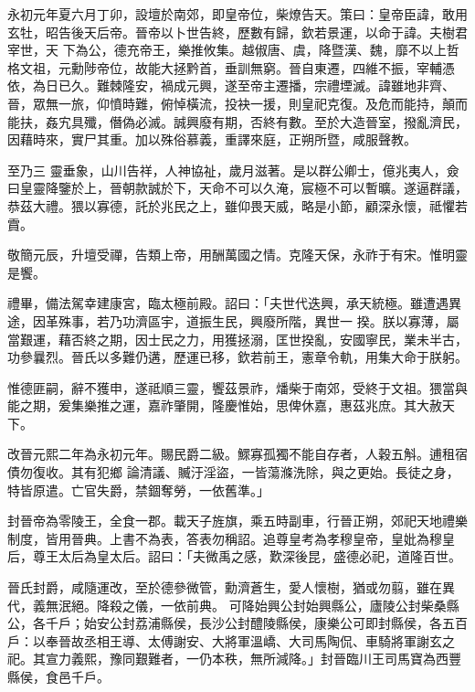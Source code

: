 
\begin{pinyinscope}

 永初元年夏六月丁卯，設壇於南郊，即皇帝位，柴燎告天。策曰：皇帝臣諱，敢用玄牡，昭告後天后帝。晉帝以卜世告終，歷數有歸，欽若景運，以命于諱。夫樹君宰世，天
 下為公，德充帝王，樂推攸集。越俶唐、虞，降暨漢、魏，靡不以上哲格文祖，元勳陟帝位，故能大拯黔首，垂訓無窮。晉自東遷，四維不振，宰輔憑依，為日已久。難棘隆安，禍成元興，遂至帝主遷播，宗禮堙滅。諱雖地非齊、晉，眾無一旅，仰憤時難，俯悼橫流，投袂一援，則皇祀克復。及危而能持，顛而能扶，姦宄具殲，僭偽必滅。誠興廢有期，否終有數。至於大造晉室，撥亂濟民，因藉時來，實尸其重。加以殊俗慕義，重譯來庭，正朔所暨，咸服聲教。



 至乃三
 靈垂象，山川告祥，人神協祉，歲月滋著。是以群公卿士，億兆夷人，僉曰皇靈降鑒於上，晉朝款誠於下，天命不可以久淹，宸極不可以暫曠。遂逼群議，恭茲大禮。猥以寡德，託於兆民之上，雖仰畏天威，略是小節，顧深永懷，祗懼若霣。



 敬簡元辰，升壇受禪，告類上帝，用酬萬國之情。克隆天保，永祚于有宋。惟明靈是饗。



 禮畢，備法駕幸建康宮，臨太極前殿。詔曰：「夫世代迭興，承天統極。雖遭遇異途，因革殊事，若乃功濟區宇，道振生民，興廢所階，異世一
 揆。朕以寡薄，屬當艱運，藉否終之期，因士民之力，用獲拯溺，匡世揆亂，安國寧民，業未半古，功參曩烈。晉氏以多難仍遘，歷運已移，欽若前王，憲章令軌，用集大命于朕躬。



 惟德匪嗣，辭不獲申，遂祗順三靈，饗茲景祚，燔柴于南郊，受終于文祖。猥當與能之期，爰集樂推之運，嘉祚肇開，隆慶惟始，思俾休嘉，惠茲兆庶。其大赦天下。



 改晉元熙二年為永初元年。賜民爵二級。鰥寡孤獨不能自存者，人穀五斛。逋租宿債勿復收。其有犯鄉
 論清議、贓汙淫盜，一皆蕩滌洗除，與之更始。長徒之身，特皆原遣。亡官失爵，禁錮奪勞，一依舊準。」



 封晉帝為零陵王，全食一郡。載天子旌旗，乘五時副車，行晉正朔，郊祀天地禮樂制度，皆用晉典。上書不為表，答表勿稱詔。追尊皇考為孝穆皇帝，皇妣為穆皇后，尊王太后為皇太后。詔曰：「夫微禹之感，歎深後昆，盛德必祀，道隆百世。



 晉氏封爵，咸隨運改，至於德參微管，勳濟蒼生，愛人懷樹，猶或勿翦，雖在異代，義無泯絕。降殺之儀，一依前典。
 可降始興公封始興縣公，廬陵公封柴桑縣公，各千戶；始安公封荔浦縣侯，長沙公封醴陵縣侯，康樂公可即封縣侯，各五百戶：以奉晉故丞相王導、太傅謝安、大將軍溫嶠、大司馬陶侃、車騎將軍謝玄之祀。其宣力義熙，豫同艱難者，一仍本秩，無所減降。」封晉臨川王司馬寶為西豐縣侯，食邑千戶。




\end{pinyinscope}
